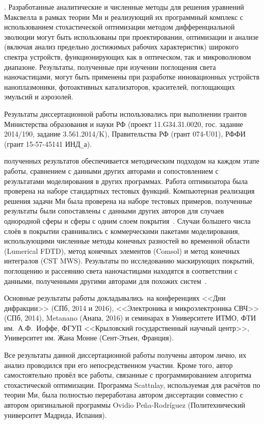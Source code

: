 {\influence}. Разработанные аналитические и численные методы для решения
уравнений Максвелла в рамках теории Ми и реализующий их
программный комплекс с использованием стохастической оптимизации
методом дифференциальной эволюции могут быть использованы при
проектировании, оптимизации и анализе (включая анализ предельно
достижимых рабочих характеристик) широкого спектра устройств,
функционирующих как в оптическом, так и микроволновом диапазоне.
Результаты, полученные при изучении поглощения света наночастицами, могут
быть применены при разработке инновационных устройств
наноплазмоники, фотоактивных катализаторов, красителей, поглощающих
эмульсий и аэрозолей.

Результаты диссертационной работы использовались при выполнении
грантов Министерства образования и науки РФ
(проект 11.G34.31.0020, гос. задание 2014/190, задание 3.561.2014/K),
Правительства РФ (грант 074-U01), РФФИ (грант 15-57-45141 ИНД\verb+_+а).


{\reliability} полученных результатов обеспечивается методическим
подходом на каждом этапе работы, сравнением с данными других авторами
и сопостовлением с результатами моделирования в других программах.
Работа оптимизатора была проверена на наборе стандартных тестовых
функций. Компьютерная реализация решения задачи Ми была проверена на
наборе тестовых примеров, полученные результаты были сопоставлены с
данными других авторов для случаев однородной сферы и сферы с одним
слоем покрытия~\cite{Suzuki-2013, Bashevoy-2005}.  Случаи большего
числа слоёв в покрытии сравнивались с коммерческими пакетами
моделирования, использующими численные методы конечных разностей во
временной области (Lumerical FDTD), метод конечных элементов (Comsol)
и метод конечных интегралов (CST MWS). Результаты по исследованию
маскирующих покрытий, поглощению и рассеянию света наночастицами
находятся в соответствии с данными, полученными другими авторами для
похожих систем~\cite{Semouchkina-2013, Alu-2014, Fan-2011}.

{\probation} Основные результаты работы докладывались~на конференциях
<<Дни дифракции>> (СПб, 2014 и 2016), <<Электроника и микроэлектроника
СВЧ>> (СПб, 2014), Metanano (Анапа, 2016) и семинарах в Университете
ИТМО, ФТИ им.~А.Ф.~Иоффе, ФГУП <<Крыловский государственный научный
центр>>, Университет им. Жана Монне (Сент-Этьен, Франция).

{\contribution} Все результаты данной диссертационной работы получены
автором лично, их анализ проводился при его непосредственном участии.
Кроме того, автор самостоятельно провёл все работы, связанные с
программированием алгоритма стохастической оптимизации.  Программа
Scattnlay, используемая для расчётов по теории Ми, была полностью
переработана автором диссертации совместно с автором оригинальной
программы Ovidio Pe\~{n}a-Rodr\'{i}guez (Политехнический университет
Мадрида, Испания).

